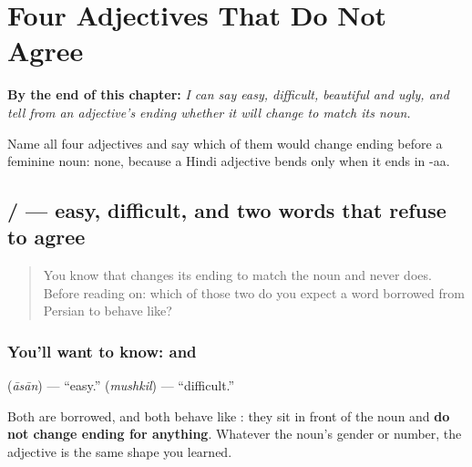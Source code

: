 
\chapter{Four Adjectives That Do Not Agree}
\label{ch:hi-adjectives-that-do-not-bend}

\begin{chapteropening}
\textbf{By the end of this chapter:} \emph{I can say easy, difficult, beautiful and ugly, and tell from an adjective's ending whether it will change to match its noun.}

Name all four adjectives and say which of them would change ending before a feminine noun: none, because a Hindi adjective bends only when it ends in -aa.
\end{chapteropening}

\section[\texorpdfstring{\hi{आसान} / \hi{मुश्किल} (āsān / mushkil)}{आसान / मुश्किल (āsān / mushkil)}]{ /  — easy, difficult, and two words that refuse to agree}

\label{lesson:HI-C80-aasaan-mushkil}



\begin{quote}
You know that \textbf{} changes its ending to match the noun and \textbf{} never does. Before reading on: which of those two do you expect a word borrowed from Persian to behave like?
\end{quote}

\subsection*{You'll want to know:  and }
\textbf{} (\emph{āsān}) — \textquotedblleft{}easy.\textquotedblright{} \textbf{} (\emph{mushkil}) — \textquotedblleft{}difficult.\textquotedblright{}

Both are borrowed, and both behave like \textbf{}: they sit in front of the noun and \textbf{do not change ending for anything}. Whatever the noun's gender or number, the adjective is the same shape you learned.

